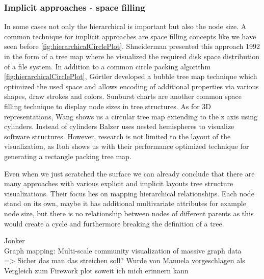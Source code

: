 \subsubsection{Implicit approaches - space filling}
In some cases not only the hierarchical is important but also the node size. A common technique for implicit approaches are space filling concepts like we have seen before \ref{fig:hierarchicalCirclePlot}.
Shneiderman \cite{shneiderman_tree_1992} presented this approach 1992 in the form of a tree map where he visualized the required disk space distribution of a file system. In addition to a common circle packing algorithm \ref{fig:hierarchicalCirclePlot}, Görtler \cite{gortler_bubble_2018} developed a bubble tree map technique which optimized the used space and allows encoding of additional properties via various shapes, draw strokes and colors. Sunburst charts are another common space filling technique to display node sizes in tree structures. 
As for 3D representations, Wang \cite{wang_visualization_2006} shows us a circular tree map extending to the z axis using cylinders. Instead of cylinders Balzer \cite{balzer_hierarchy_2004} uses nested hemispheres to visualize software structures. 
However, research is not limited to the layout of the visualization, as Itoh \cite{itoh_hierarchical_2004} shows us with their performance optimized technique for generating a rectangle packing tree map.

Even when we just scratched the surface we can already conclude that there are many approaches with various explicit and implicit layouts tree structure visualizations. Their focus lies on mapping hierarchical relationships. Each node stand on its own, maybe it has additional multivariate attributes for example node size, but there is no relationship between nodes of different parents as this would create a cycle and furthermore breaking the definition of a tree.

Jonker\\
Graph mapping: Multi-scale community visualization of massive graph data\\
=> Sicher das man das streichen soll? Wurde von Manuela vorgeschlagen als Vergleich zum Firework plot soweit ich mich erinnern kann

